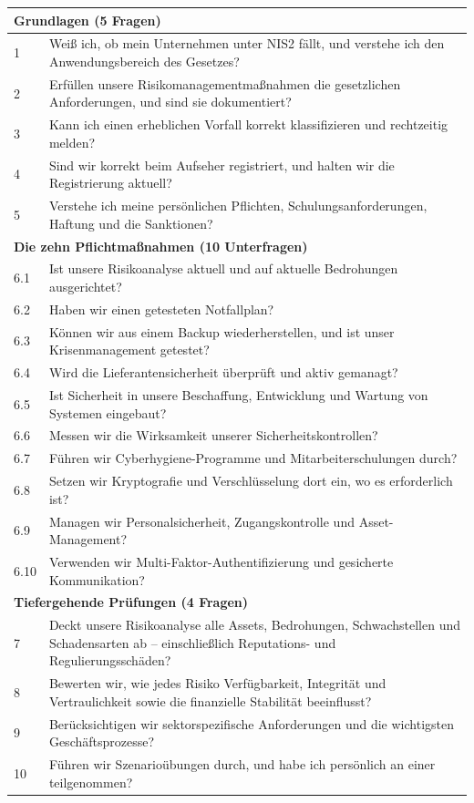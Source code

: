 \documentclass[11pt,a4paper,twoside]{book}
\begin{document}
\begin{center}
\begin{tabular}{@{}p{0.3cm}p{10.5cm}@{}}
\toprule
\multicolumn{2}{l}{\textbf{Grundlagen (5 Fragen)}} \\
\midrule
1 & Weiß ich, ob mein Unternehmen unter NIS2 fällt, und verstehe ich den Anwendungsbereich des Gesetzes? \\
2 & Erfüllen unsere Risikomanagementmaßnahmen die gesetzlichen Anforderungen, und sind sie dokumentiert? \\
3 & Kann ich einen erheblichen Vorfall korrekt klassifizieren und rechtzeitig melden? \\
4 & Sind wir korrekt beim Aufseher registriert, und halten wir die Registrierung aktuell? \\
5 & Verstehe ich meine persönlichen Pflichten, Schulungsanforderungen, Haftung und die Sanktionen? \\
\midrule
\multicolumn{2}{l}{\textbf{Die zehn Pflichtmaßnahmen (10 Unterfragen)}} \\
\midrule
6.1 & Ist unsere Risikoanalyse aktuell und auf aktuelle Bedrohungen ausgerichtet? \\
6.2 & Haben wir einen getesteten Notfallplan? \\
6.3 & Können wir aus einem Backup wiederherstellen, und ist unser Krisenmanagement getestet? \\
6.4 & Wird die Lieferantensicherheit überprüft und aktiv gemanagt? \\
6.5 & Ist Sicherheit in unsere Beschaffung, Entwicklung und Wartung von Systemen eingebaut? \\
6.6 & Messen wir die Wirksamkeit unserer Sicherheitskontrollen? \\
6.7 & Führen wir Cyberhygiene-Programme und Mitarbeiterschulungen durch? \\
6.8 & Setzen wir Kryptografie und Verschlüsselung dort ein, wo es erforderlich ist? \\
6.9 & Managen wir Personalsicherheit, Zugangskontrolle und Asset-Management? \\
6.10 & Verwenden wir Multi-Faktor-Authentifizierung und gesicherte Kommunikation? \\
\midrule
\multicolumn{2}{l}{\textbf{Tiefergehende Prüfungen (4 Fragen)}} \\
\midrule
7 & Deckt unsere Risikoanalyse alle Assets, Bedrohungen, Schwachstellen und Schadensarten ab -- einschließlich Reputations- und Regulierungsschäden? \\
8 & Bewerten wir, wie jedes Risiko Verfügbarkeit, Integrität und Vertraulichkeit sowie die finanzielle Stabilität beeinflusst? \\
9 & Berücksichtigen wir sektorspezifische Anforderungen und die wichtigsten Geschäftsprozesse? \\
10 & Führen wir Szenarioübungen durch, und habe ich persönlich an einer teilgenommen? \\
\bottomrule
\end{tabular}
\end{center}
\end{document}

